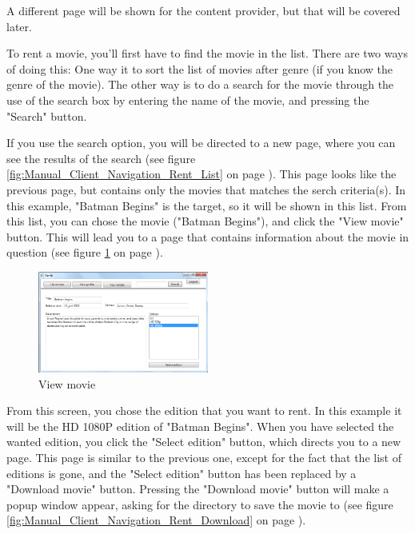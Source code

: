 A different page will be shown for the content provider, but that will be covered later.

To rent a movie, you'll first have to find the movie in the list. There are two ways of doing this: One way it to sort the list of movies after genre (if you know the genre of the movie). The other way is to do a search for the movie through the use of the search box by entering the name of the movie, and pressing the "Search" button.

If you use the search option, you will be directed to a new page, where you can see the results of the search (see figure \ref{fig:Manual_Client_Navigation_Rent_List} on page \pageref{fig:Manual_Client_Navigation_Rent_View}). This page looks like the previous page, but contains only the movies that matches the serch criteria(s). In this example, "Batman Begins" is the target, so it will be shown in this list. From this list, you can chose the movie ("Batman Begins"), and click the "View movie" button. This will lead you to a page that contains information about the movie in question (see figure \ref{fig:Manual_Client_Navigation_Rent_View} on page \pageref{fig:Manual_Client_Navigation_Rent_View}).

\begin{figure}[h!]  
  \centering
\includegraphics[width=0.5\textwidth]{Parts/Images/Manual/Viewmovie}
\caption{View movie}
\label{fig:Manual_Client_Navigation_Rent_View}
\end{figure}

From this screen, you chose the edition that you want to rent. In this example it will be the HD 1080P edition of "Batman Begins". When you have selected the wanted edition, you click the "Select edition" button, which directs you to a new page. This page is similar to the previous one, except for the fact that the list of editions is gone, and the "Select edition" button has been replaced by a "Download movie" button. Pressing the "Download movie" button will make a popup window appear, asking for the directory to save the movie to (see figure \ref{fig:Manual_Client_Navigation_Rent_Download} on page \pageref{fig:Manual_Client_Navigation_Rent_Download}).


